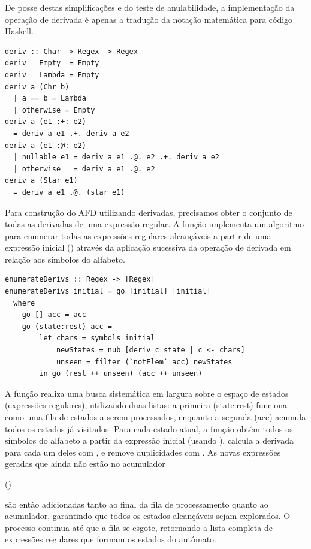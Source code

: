     De posse destas simplificações e do teste de anulabilidade, a
    implementação da operação de derivada é apenas a tradução da
    notação matemática para código Haskell.

\begin{verbatim}
deriv :: Char -> Regex -> Regex
deriv _ Empty  = Empty
deriv _ Lambda = Empty
deriv a (Chr b)
  | a == b = Lambda
  | otherwise = Empty
deriv a (e1 :+: e2)
  = deriv a e1 .+. deriv a e2
deriv a (e1 :@: e2)
  | nullable e1 = deriv a e1 .@. e2 .+. deriv a e2
  | otherwise   = deriv a e1 .@. e2
deriv a (Star e1)
  = deriv a e1 .@. (star e1)
\end{verbatim}

    Para construção do AFD utilizando derivadas, precisamos obter o
    conjunto de todas as derivadas de uma expressão regular. A função
     implementa um algoritmo
    para enumerar todas as expressões regulares alcançáveis a partir
    de uma expressão inicial ()
    através da aplicação sucessiva da operação de derivada em relação
    aos símbolos do alfabeto.

\begin{verbatim}
enumerateDerivs :: Regex -> [Regex]
enumerateDerivs initial = go [initial] [initial]
  where
    go [] acc = acc
    go (state:rest) acc =
        let chars = symbols initial
            newStates = nub [deriv c state | c <- chars]
            unseen = filter (`notElem` acc) newStates
        in go (rest ++ unseen) (acc ++ unseen)
\end{verbatim}

    A função  realiza uma
    busca sistemática em largura sobre o espaço de estados
    (expressões regulares), utilizando duas listas: a primeira
    (state:rest) funciona como uma fila de estados a serem
    processados, enquanto a segunda (acc) acumula todos os estados já
    visitados. Para cada estado atual, a função obtém todos os
    símbolos do alfabeto a partir da expressão inicial (usando
    ), calcula a derivada
    para cada um deles com , e
    remove duplicidades com . As novas
    expressões geradas que ainda não estão no acumulador

    ()

    são então adicionadas tanto ao final da fila de processamento quanto
    ao acumulador, garantindo que todos os estados alcançáveis sejam
    explorados. O processo continua até que a fila se esgote,
    retornando a lista completa de expressões regulares que formam os
    estados do autômato.

